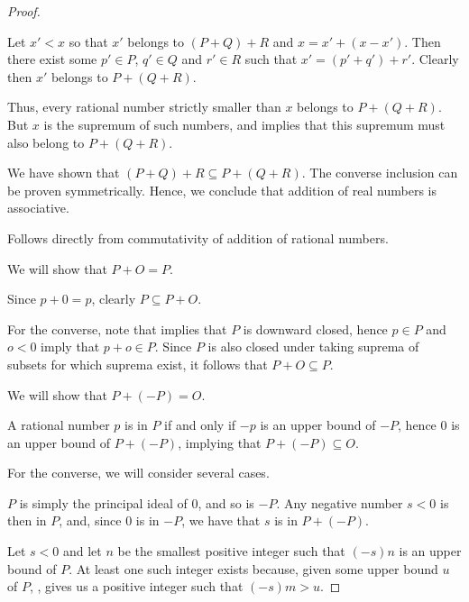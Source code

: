 \begin{proof}
\begin{itemize}
    Let \( x' < x \) so that \( x' \) belongs to \( (P + Q) + R \) and \( x = x' + (x - x') \). Then there exist some \( p' \in P \), \( q' \in Q \) and \( r' \in R \) such that \( x' = (p' + q') + r' \). Clearly then \( x' \) belongs to \( P + (Q + R) \).

    Thus, every rational number strictly smaller than \( x \) belongs to \( P + (Q + R) \). But \( x \) is the supremum of such numbers, and  implies that this supremum must also belong to \( P + (Q + R) \).
  \end{itemize}

  We have shown that \( (P + Q) + R \subseteq P + (Q + R) \). The converse inclusion can be proven symmetrically. Hence, we conclude that addition of real numbers is associative.

   Follows directly from commutativity of addition of rational numbers.

   We will show that \( P + O = P \).

  Since \( p + 0 = p \), clearly \( P \subseteq P + O \).

  For the converse, note that  implies that \( P \) is downward closed, hence \( p \in P \) and \( o < 0 \) imply that \( p + o \in P \). Since \( P \) is also closed under taking suprema of subsets for which suprema exist, it follows that \( P + O \subseteq P \).

   We will show that \( P + (-P) = O \).

  A rational number \( p \) is in \( P \) if and only if \( -p \) is an upper bound of \( -P \), hence \( 0 \) is an upper bound of \( P + (-P) \), implying that \( P + (-P) \subseteq O \).

  For the converse, we will consider several cases.

   \( P \) is simply the principal ideal of \( 0 \), and so is \( -P \). Any negative number \( s < 0 \) is then in \( P \), and, since \( 0 \) is in \( -P \), we have that \( s \) is in \( P + (-P) \).

   Let \( s < 0 \) and let \( n \) be the smallest positive integer such that \( (-s)n \) is an upper bound of \( P \). At least one such integer exists because, given some upper bound \( u \) of \( P \), , gives us a positive integer such that \( (-s)m > u \).


\end{proof}
